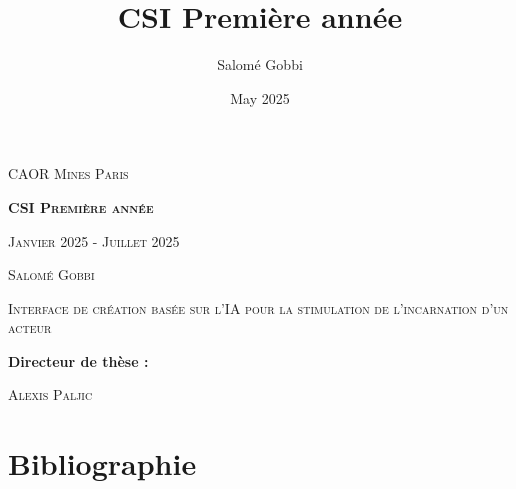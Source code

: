 \documentclass[12pt,a4paper]{article}
\title{CSI Première année}
\author{Salomé Gobbi}
\date{May 2025}
\begin{document}
\begin{titlepage}
    \begin{center}
        \vspace*{1cm}
        
        \large{\textsc{CAOR Mines Paris}}
        
        \vspace{0.5cm}
        \textbf{\Huge{\textsc{CSI Première année}}}
        
        \vspace{0.5cm}
        \textsc{Janvier 2025 - Juillet 2025}
        
        \vspace{1cm}
        
        \Large{\textsc{Salomé Gobbi}}

        \vspace{0.5cm}
        \large{\textsc{Interface de création basée sur l'IA pour la stimulation de l'incarnation d'un acteur}}
        
        \vspace{0.8cm}
        
        \begin{multicols}{2}
        \raggedleft
        \textbf{\large{Directeur de thèse :}}\\
        \raggedright
        \textsc{Alexis Paljic}\\
        \end{multicols}
        
    \end{center}
\end{titlepage}

\renewcommand{\contentsname}{Sommaire}
\tableofcontents
\newpage

\pagestyle{fancy}
\renewcommand\headrulewidth{1pt}
\fancyhead[R]{}

\newpage


\newpage


\newpage


\newpage


\newpage


\newpage
\section{Bibliographie}
\printbibliography
\end{document}
